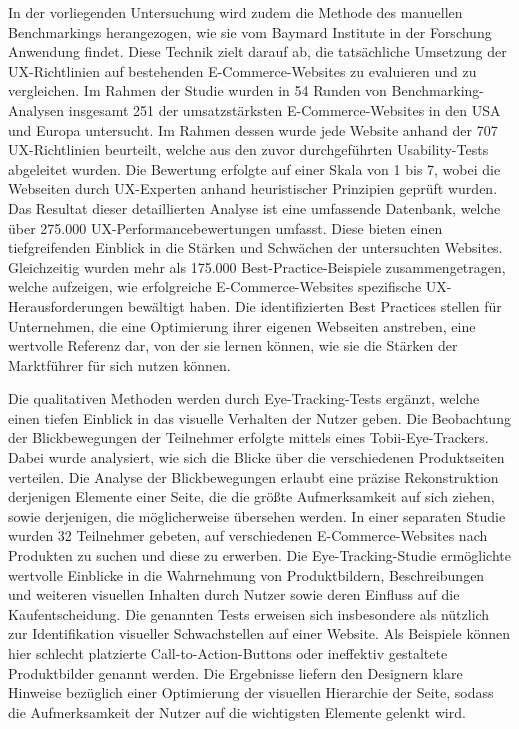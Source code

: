 In der vorliegenden Untersuchung wird zudem die Methode des manuellen Benchmarkings herangezogen, wie sie vom Baymard Institute in der Forschung Anwendung findet. Diese Technik zielt darauf ab, die tatsächliche Umsetzung der UX-Richtlinien auf bestehenden E-Commerce-Websites zu evaluieren und zu vergleichen. Im Rahmen der Studie wurden in 54 Runden von Benchmarking-Analysen insgesamt 251 der umsatzstärksten E-Commerce-Websites in den USA und Europa untersucht. Im Rahmen dessen wurde jede Website anhand der 707 UX-Richtlinien beurteilt, welche aus den zuvor durchgeführten Usability-Tests abgeleitet wurden. Die Bewertung erfolgte auf einer Skala von 1 bis 7, wobei die Webseiten durch UX-Experten anhand heuristischer Prinzipien geprüft wurden. 
Das Resultat dieser detaillierten Analyse ist eine umfassende Datenbank, welche über 275.000 UX-Performancebewertungen umfasst. Diese bieten einen tiefgreifenden Einblick in die Stärken und Schwächen der untersuchten Websites. Gleichzeitig wurden mehr als 175.000 Best-Practice-Beispiele zusammengetragen, welche aufzeigen, wie erfolgreiche E-Commerce-Websites spezifische UX-Herausforderungen bewältigt haben. Die identifizierten Best Practices stellen für Unternehmen, die eine Optimierung ihrer eigenen Webseiten anstreben, eine wertvolle Referenz dar, von der sie lernen können, wie sie die Stärken der Marktführer für sich nutzen können.

Die qualitativen Methoden werden durch Eye-Tracking-Tests ergänzt, welche einen tiefen Einblick in das visuelle Verhalten der Nutzer geben. Die Beobachtung der Blickbewegungen der Teilnehmer erfolgte mittels eines Tobii-Eye-Trackers. Dabei wurde analysiert, wie sich die Blicke über die verschiedenen Produktseiten verteilen. Die Analyse der Blickbewegungen erlaubt eine präzise Rekonstruktion derjenigen Elemente einer Seite, die die größte Aufmerksamkeit auf sich ziehen, sowie derjenigen, die möglicherweise übersehen werden. In einer separaten Studie wurden 32 Teilnehmer gebeten, auf verschiedenen E-Commerce-Websites nach Produkten zu suchen und diese zu erwerben. Die Eye-Tracking-Studie ermöglichte wertvolle Einblicke in die Wahrnehmung von Produktbildern, Beschreibungen und weiteren visuellen Inhalten durch Nutzer sowie deren Einfluss auf die Kaufentscheidung. Die genannten Tests erweisen sich insbesondere als nützlich zur Identifikation visueller Schwachstellen auf einer Website. Als Beispiele können hier schlecht platzierte Call-to-Action-Buttons oder ineffektiv gestaltete Produktbilder genannt werden. Die Ergebnisse liefern den Designern klare Hinweise bezüglich einer Optimierung der visuellen Hierarchie der Seite, sodass die Aufmerksamkeit der Nutzer auf die wichtigsten Elemente gelenkt wird.

